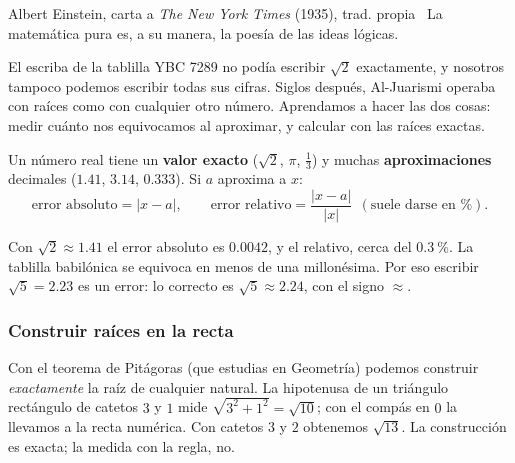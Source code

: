 \documentclass[11pt]{article}
\begin{document}
\begin{cita}{Albert Einstein, carta a \emph{The New York Times} (1935), trad. propia~\cite{einstein}}
La matemática pura es, a su manera, la poesía de las ideas lógicas.
\end{cita}

\label{tema:numerosreales}

\begin{hilo}
El escriba de la tablilla YBC 7289 no podía escribir $\sqrt{2}$ exactamente,
y nosotros tampoco podemos escribir todas sus cifras. Siglos después,
Al-Juarismi operaba con raíces como con cualquier otro número. Aprendamos a
hacer las dos cosas: medir cuánto nos equivocamos al aproximar, y calcular
con las raíces exactas.
\end{hilo}

\begin{definicion}
Un número real tiene un \textbf{valor exacto} ($\sqrt{2}$, $\pi$,
$\frac{1}{3}$) y muchas \textbf{aproximaciones} decimales ($\num{1,41}$,
$\num{3,14}$, $\num{0,333}$). Si $a$ aproxima a $x$:
\[
  \text{error absoluto} = |x - a|, \qquad
  \text{error relativo} = \frac{|x - a|}{|x|}\ \ (\text{suele darse en \%}).
\]
\end{definicion}

Con $\sqrt{2} \approx \num{1,41}$ el error absoluto es $\num{0,0042}$, y el
relativo, cerca del $\qty{0,3}{\percent}$. La tablilla babilónica se equivoca
en menos de una millonésima. Por eso escribir $\sqrt{5} = \num{2,23}$ es un
error: lo correcto es $\sqrt{5} \approx \num{2,24}$, con el signo $\approx$.

\subsubsection*{Construir raíces en la recta}

Con el teorema de Pitágoras (que estudias en Geometría) podemos construir
\emph{exactamente} la raíz de cualquier natural. La hipotenusa de un
triángulo rectángulo de catetos $3$ y $1$ mide $\sqrt{3^2 + 1^2} = \sqrt{10}$;
con el compás en $0$ la llevamos a la recta numérica. Con catetos $3$ y $2$
obtenemos $\sqrt{13}$. La construcción es exacta; la medida con la regla, no.
\end{document}
